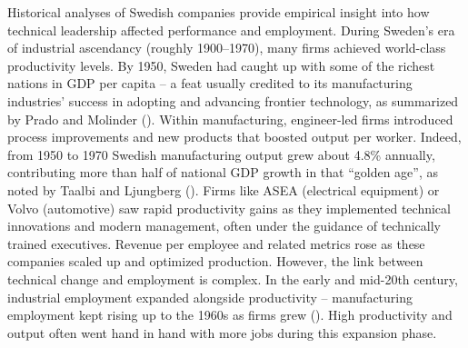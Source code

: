 \documentclass[
]{article}
\begin{document}
Historical analyses of Swedish companies provide empirical insight into
how technical leadership affected performance and employment. During
Sweden's era of industrial ascendancy (roughly 1900--1970), many firms
achieved world-class productivity levels. By 1950, Sweden had caught up
with some of the richest nations in GDP per capita -- a feat usually
credited to its manufacturing industries' success in adopting and
advancing frontier technology\hspace{0pt}, as summarized by Prado and
Molinder (). Within
manufacturing, engineer-led firms introduced process improvements and
new products that boosted output per worker. Indeed, from 1950 to 1970
Swedish manufacturing output grew about 4.8\% annually, contributing
more than half of national GDP growth in that ``golden age'', as noted
by Taalbi and Ljungberg
()\hspace{0pt}.
Firms like ASEA (electrical equipment) or Volvo (automotive) saw rapid
productivity gains as they implemented technical innovations and modern
management, often under the guidance of technically trained executives.
Revenue per employee and related metrics rose as these companies scaled
up and optimized production. However, the link between technical change
and employment is complex. In the early and mid-20th century, industrial
employment expanded alongside productivity -- manufacturing employment
kept rising up to the 1960s as firms grew\hspace{0pt}
(). High productivity and output often went hand in hand with more
jobs during this expansion phase.
\end{document}
